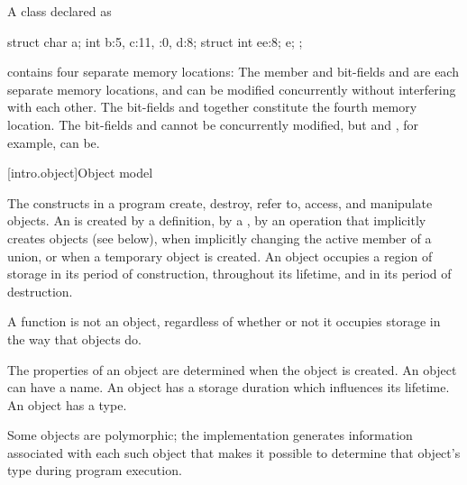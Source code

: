 \pnum
\begin{example}
A class declared as
\begin{codeblock}
struct {
  char a;
  int b:5,
  c:11,
  :0,
  d:8;
  struct {int ee:8;} e;
};
\end{codeblock}
contains four separate memory locations: The member  and bit-fields
 and  are each separate memory locations, and can be
modified concurrently without interfering with each other. The bit-fields
 and  together constitute the fourth memory location. The
bit-fields  and  cannot be concurrently modified, but
 and , for example, can be.
\end{example}

[intro.object]{Object model}

\pnum
{}%
The constructs in a \Cpp{} program create, destroy, refer to, access, and
manipulate objects.
An  is created
by a definition,
by a ,
by an operation that implicitly creates objects (see below),
when implicitly changing the active member of a union,
or
when a temporary object is created.
An object occupies a region of storage
in its period of construction,
throughout its lifetime,
and
in its period of destruction.
\begin{note}
A function is not an object, regardless of whether or not it
occupies storage in the way that objects do.
\end{note}
The properties of an
object are determined when the object is created. An object can have a
name. An object has a storage
duration which influences its
lifetime. An object has a
type.
\begin{note}
Some objects are
polymorphic; the implementation
generates information associated with each such object that makes it
possible to determine that object's type during program execution.
\end{note}

